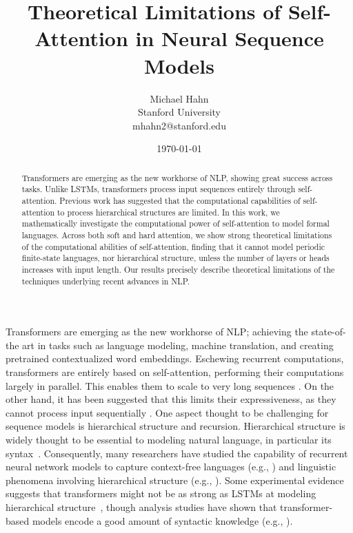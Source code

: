 \documentclass[11pt,a4paper]{article}
\title{Theoretical Limitations of Self-Attention in Neural Sequence Models}
\author{Michael Hahn \\ Stanford University \\ mhahn2@stanford.edu}
\date{\today}
\begin{document}
\maketitle
\begin{abstract}
Transformers are emerging as the new workhorse of NLP, showing great success across tasks.
Unlike LSTMs, transformers process input sequences entirely through self-attention.
Previous work has suggested that the computational capabilities of self-attention to process hierarchical structures are limited.
In this work, we mathematically investigate the computational power of self-attention to model formal languages.
Across both soft and hard attention, we show strong theoretical limitations of the computational abilities of self-attention, finding that it cannot model periodic finite-state languages, nor hierarchical structure, unless the number of layers or heads increases with input length.
Our results precisely describe theoretical limitations of the techniques underlying recent advances in NLP.
\end{abstract}


Transformers are emerging as the new workhorse of NLP; achieving the state-of-the art in tasks such as language modeling, machine translation, and creating pretrained contextualized word embeddings.
Eschewing recurrent computations, transformers are entirely based on self-attention, performing their computations largely in parallel.
This enables them to scale to very long sequences \cite{vaswani2017attention,dai2019transformer,child2019generating}.
On the other hand, it has been suggested that this limits their expressiveness, as they cannot process input sequentially \cite{tran2018importance,dehghani2018universal,shen2018disan,chen2018best,hao2019modeling}.
One aspect thought to be challenging for sequence models is hierarchical structure and recursion.
Hierarchical structure is widely thought to be essential to modeling natural language, in particular its syntax~\cite{everaert2015structures}.
Consequently, many researchers have studied the capability of recurrent neural network models to capture context-free languages (e.g., \citet{kalinke1998computation,gers2001lstm,gruning2006stack,weiss2018practical,sennhauser2018evaluating,korsky2019computational}) and linguistic phenomena involving hierarchical structure (e.g., \citet{linzen2016assessing,gulordava2018colorless}).
Some experimental evidence suggests that transformers might not be as strong as LSTMs at modeling hierarchical structure~\cite{tran2018importance}, though analysis studies have shown that transformer-based models encode a good amount of syntactic knowledge (e.g., \citet{clark2019bert,lin2019open,tenney2019bert}).
\end{document}

